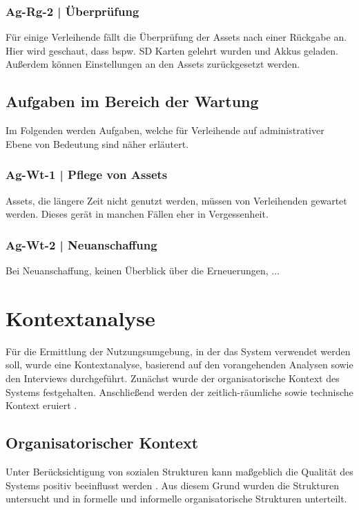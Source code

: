 \subsubsection{Ag-Rg-2 | Überprüfung}
Für einige Verleihende fällt die Überprüfung der Assets nach einer Rückgabe an. Hier wird geschaut,
dass bspw. SD Karten gelehrt wurden und Akkus geladen. Außerdem können Einstellungen an den Assets
zurückgesetzt werden. 
\subsection{Aufgaben im Bereich der Wartung}
\label{subsec:wartung}
Im Folgenden werden Aufgaben, welche für Verleihende auf administrativer Ebene von Bedeutung sind
näher erläutert. 

\subsubsection{Ag-Wt-1 | Pflege von Assets}
\label{subsubsection:Ag-Wt-1}
Assets, die längere Zeit nicht genutzt werden, müssen von Verleihenden gewartet werden. Dieses gerät
in manchen Fällen eher in Vergessenheit. 

\subsubsection{Ag-Wt-2 | Neuanschaffung}
\label{subsubsection:Ag-Wt-2}
Bei Neuanschaffung, keinen Überblick über die Erneuerungen, ...



\section{Kontextanalyse}
\label{section:kontext}

Für die Ermittlung der Nutzungsumgebung, in der das System verwendet werden soll, wurde eine
Kontextanalyse, basierend auf den vorangehenden Analysen sowie den Interviews durchgeführt. Zunächst
wurde der organisatorische Kontext des Systems festgehalten. Anschließend werden der
zeitlich-räumliche sowie technische Kontext eruiert \cite{herczeg_einfuhrung_2009}.

\subsection{Organisatorischer Kontext}
Unter Berücksichtigung von sozialen Strukturen kann maßgeblich die Qualität des Systems positiv
beeinflusst werden \cite{herczeg_einfuhrung_2009}. Aus diesem Grund wurden die Strukturen untersucht
und in formelle und informelle organisatorische Strukturen unterteilt.

